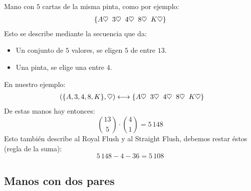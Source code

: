  Mano con \(5\) cartas de la misma pinta,
  como por ejemplo:
  \begin{equation*}
    \begin{array}{@{\{}*{4}{c@{\;\;}}c@{\}}}
      A \heartsuit & 3 \heartsuit & 4 \heartsuit &
	8 \heartsuit & K \heartsuit
    \end{array}
  \end{equation*}
  Esto se describe mediante la secuencia que da:
  \begin{itemize}
  \item
    Un conjunto de \(5\) valores,
    se eligen \(5\) de entre \(13\).
  \item
    Una pinta,
    se elige una entre \(4\).
  \end{itemize}
  En nuestro ejemplo:
  \begin{equation*}
    \begin{array}{l@{{} \longleftrightarrow \{}*{4}{c@{\;\;}}c@{\}}}
      (\{A, 3, 4, 8, K\}, \heartsuit) &
	 A \heartsuit & 3 \heartsuit & 4 \heartsuit &
	   8 \heartsuit & K \heartsuit
    \end{array}
  \end{equation*}
  De estas manos hay entonces:
  \begin{equation*}
    \binom{13}{5} \cdot \binom{4}{1} = 5\,148
  \end{equation*}
  Esto también describe al \foreignlanguage{english}{Royal Flush}
  y al \foreignlanguage{english}{Straight Flush},
  debemos restar éstos
  (regla de la suma):%
  \begin{equation*}
    5\,148 - 4 - 36 = 5\,108
  \end{equation*}

\subsection{Manos con dos pares}
\label{sec:dos-pares}

